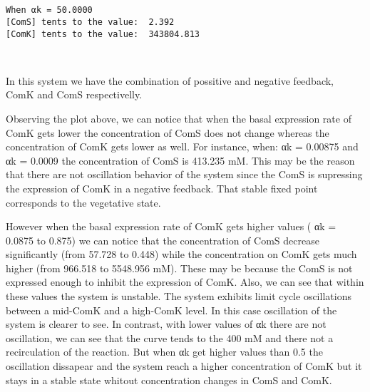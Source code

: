 \documentclass[11pt]{article}
\begin{document}
    \begin{center}
    \end{center}
    { \hspace*{\fill} \\}
    
    \begin{center}
    \end{center}
    { \hspace*{\fill} \\}
    
    \begin{Verbatim}[commandchars=\\\{\}]
When αk = 50.0000
[ComS] tents to the value:  2.392
[ComK] tents to the value:  343804.813

    \end{Verbatim}

    \begin{center}
    \end{center}
    { \hspace*{\fill} \\}
    
    In this system we have the combination of possitive and negative
feedback, ComK and ComS respectivelly.

Observing the plot above, we can notice that when the basal expression
rate of ComK gets lower the concentration of ComS does not change
whereas the concentration of ComK gets lower as well. For instance,
when: αk = 0.00875 and αk = 0.0009 the concentration of ComS is 413.235
mM. This may be the reason that there are not oscillation behavior of
the system since the ComS is supressing the expression of ComK in a
negative feedback. That stable fixed point corresponds to the vegetative
state.

However when the basal expression rate of ComK gets higher values ( αk =
0.0875 to 0.875) we can notice that the concentration of ComS decrease
significantly (from 57.728 to 0.448) while the concentration on ComK
gets much higher (from 966.518 to 5548.956 mM). These may be because the
ComS is not expressed enough to inhibit the expression of ComK. Also, we
can see that within these values the system is unstable. The system
exhibits limit cycle oscillations between a mid-ComK and a high-ComK
level. In this case oscillation of the system is clearer to see. In
contrast, with lower values of αk there are not oscillation, we can see
that the curve tends to the 400 mM and there not a recirculation of the
reaction. But when αk get higher values than 0.5 the oscillation
dissapear and the system reach a higher concentration of ComK but it
stays in a stable state whitout concentration changes in ComS and ComK.
\end{document}

